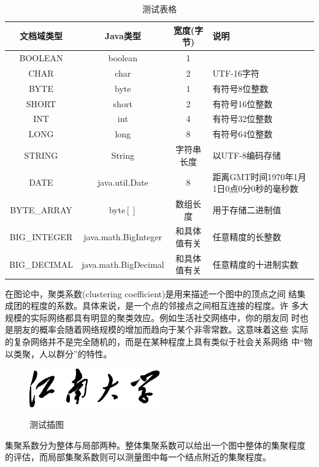 \documentclass[phd]{jnuthesis}
\begin{document}
\begin{table}
  \centering
  \begin{tabular}{cccp{38mm}}
    \toprule
    \textbf{文档域类型} & \textbf{Java类型} & \textbf{宽度(字节)} & \textbf{说明} \\
    \midrule
    BOOLEAN  & boolean &  1  & \\
    CHAR     & char    &  2  & UTF-16字符 \\
    BYTE     & byte    &  1  & 有符号8位整数 \\
    SHORT    & short   &  2  & 有符号16位整数 \\
    INT      & int     &  4  & 有符号32位整数 \\
    LONG     & long    &  8  & 有符号64位整数 \\
    STRING   & String  &  字符串长度  & 以UTF-8编码存储 \\
    DATE     & java.util.Date & 8 & 距离GMT时间1970年1月1日0点0分0秒的毫秒数 \\
    BYTE\_ARRAY & byte$[]$ & 数组长度 & 用于存储二进制值 \\
    BIG\_INTEGER & java.math.BigInteger & 和具体值有关 & 任意精度的长整数 \\
    BIG\_DECIMAL & java.math.BigDecimal & 和具体值有关 & 任意精度的十进制实数 \\
    \bottomrule
  \end{tabular}
  \caption{测试表格}\label{table:test3}
\end{table}

在图论中，聚类系数(clustering coefficient)是用来描述一个图中的顶点之间
结集成团的程度的系数。具体来说，是一个点的邻接点之间相互连接的程度。许
多大规模的实际网络都具有明显的聚类效应。例如生活社交网络中，你的朋友同
时也是朋友的概率会随着网络规模的增加而趋向于某个非零常数。这意味着这些
实际的复杂网络并不是完全随机的，而是在某种程度上具有类似于社会关系网络
中“物以类聚，人以群分”的特性。

\begin{figure}[htbp]
  \centering
  \includegraphics[width= 0.5\textwidth]{jnuname.eps}\\
  \caption{测试插图}\label{fig:test4}
\end{figure}

集聚系数分为整体与局部两种。整体集聚系数可以给出一个图中整体的集聚程度
的评估，而局部集聚系数则可以测量图中每一个结点附近的集聚程度。
\end{document}

